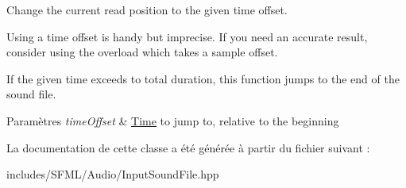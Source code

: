 Change the current read position to the given time offset. 

Using a time offset is handy but imprecise. If you need an accurate result, consider using the overload which takes a sample offset.

If the given time exceeds to total duration, this function jumps to the end of the sound file.


\begin{DoxyParams}{Paramètres}
{\em time\+Offset} & \hyperlink{classsf_1_1Time}{Time} to jump to, relative to the beginning \\
\hline
\end{DoxyParams}


La documentation de cette classe a été générée à partir du fichier suivant \+:\begin{DoxyCompactItemize}
\item 
includes/\+S\+F\+M\+L/\+Audio/Input\+Sound\+File.\+hpp\end{DoxyCompactItemize}
